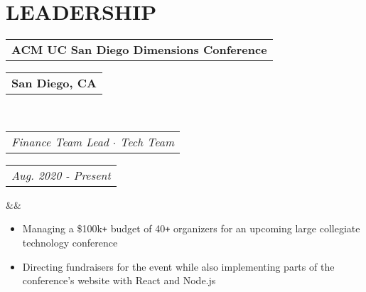 \documentclass[11pt,letterpaper,sans]{moderncv}        %
\makeatletter
\newcommand*{\customcventry}[7][.25em]{
  \begin{tabular}{@{}l} 
    {\bfseries #4}
  \end{tabular}
  \hfill%
  \begin{tabular}{l@{}}
     {\bfseries #5}
  \end{tabular} \\
  \begin{tabular}{@{}l} 
    {\itshape #3}
  \end{tabular}
  \hfill%
  \begin{tabular}{l@{}}
     {\itshape #2}
  \end{tabular}
  \ifx&#7&%
  \else{\\%
    \begin{minipage}{\maincolumnwidth}%
      #7%
    \end{minipage}}\fi%
  \par\addvspace{#1}}
\makeatother
\begin{document}
\vspace*{-4mm}

\section{LEADERSHIP}
\customcventry{Aug. 2020 - Present}{Finance Team Lead $\cdot$ Tech Team}{ACM UC San Diego Dimensions Conference}{San Diego, CA}{e}{}
\begin{itemize}
    \item Managing a \$100k\texttt{+} budget of 40\texttt{+} organizers for an upcoming large collegiate technology conference
    \item Directing fundraisers for the event while also implementing parts of the conference's website with React and Node.js
\end{itemize}

\nocite{*}



\end{document}
